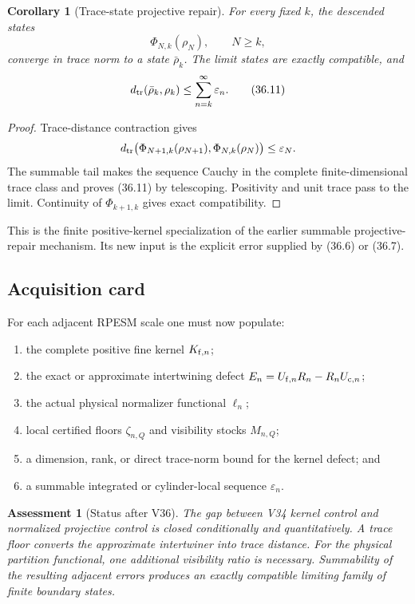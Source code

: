 \documentclass[11pt]{article}
\newtheorem{corollary}[theorem]{Corollary}
\newtheorem{assessment}[theorem]{Assessment}
\theoremstyle{remark}
\begin{document}
\begin{corollary}[Trace-state projective repair]
\label{cor:v12v36-projective-repair}
For every fixed \(k\), the descended states
\[
 \Phi_{N,k}(\rho_N),\qquad N\geq k,
\]
converge in trace norm to a state \(\bar\rho_k\).  The limit states
are exactly compatible, and
\begin{equation}
 d_{\rm tr}(\bar\rho_k,\rho_k)
 \leq
 \sum_{n=k}^\infty\varepsilon_n.                 \tag{36.11}
\end{equation}
\end{corollary}

\begin{proof}
Trace-distance contraction gives
\[
 d_{\rm tr}\bigl(
 \Phi_{N+1,k}(\rho_{N+1}),
 \Phi_{N,k}(\rho_N)
 \bigr)
 \leq\varepsilon_N.
\]
The summable tail makes the sequence Cauchy in the complete
finite-dimensional trace class and proves (36.11) by telescoping.
Positivity and unit trace pass to the limit.  Continuity of
\(\Phi_{k+1,k}\) gives exact compatibility.
\end{proof}

This is the finite positive-kernel specialization of the earlier
summable projective-repair mechanism.  Its new input is the explicit
error supplied by (36.6) or (36.7).

\subsection{Acquisition card}

For each adjacent RPESM scale one must now populate:

\begin{enumerate}
\item the complete positive fine kernel \(K_{{\rm f},n}\);
\item the exact or approximate intertwining defect
\(E_n=U_{{\rm f},n}R_n-R_nU_{{\rm c},n}\);
\item the actual physical normalizer functional \(\ell_n\);
\item local certified floors \(\zeta_{n,Q}\) and visibility stocks
\(M_{n,Q}\);
\item a dimension, rank, or direct trace-norm bound for the kernel
defect; and
\item a summable integrated or cylinder-local sequence
\(\varepsilon_n\).
\end{enumerate}

\begin{assessment}[Status after V36]
\label{ass:v12v36-status}
The gap between V34 kernel control and normalized projective control
is closed conditionally and quantitatively.  A trace floor converts
the approximate intertwiner into trace distance.  For the physical
partition functional, one additional visibility ratio is necessary.
Summability of the resulting adjacent errors produces an exactly
compatible limiting family of finite boundary states.
\end{assessment}
\end{document}
